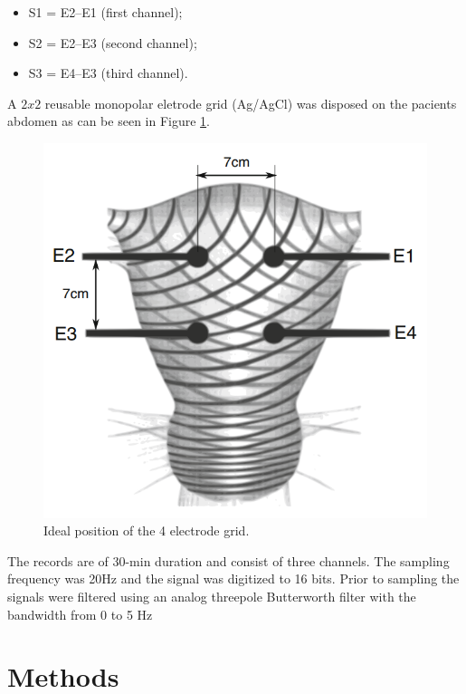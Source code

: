 \documentclass[bioengineering,article,submit,moreauthors,pdftex,10pt,a4paper]{mdpi}
\begin{document}
\begin{itemize}[leftmargin=*,labelsep=5.8mm]
	\item S1 = E2–E1 (first channel);
	\item S2 = E2–E3 (second channel);
	\item S3 = E4–E3 (third channel).
\end{itemize}

A $2x2$ reusable monopolar eletrode grid (Ag/AgCl) was disposed on the pacients abdomen as can be seen in Figure \ref{abd_elec4x4}. 

 \begin{figure}[H]
 	\caption{\label{abd_elec4x4} Ideal position of the 4 electrode grid. }
 	\begin{center}
 		\includegraphics[scale=0.50]{imagens/abd_elec4x4.png} 		
 	\end{center}
 \end{figure}
 
 The records are of 30-min
 duration and consist of three channels. The sampling frequency was 20Hz and the signal was digitized to 16 bits. Prior to
 sampling the signals were filtered using an analog threepole Butterworth filter with the bandwidth from 0 to 5 Hz \cite{ref-baseboa}
 
 \section{Methods}
\end{document}

